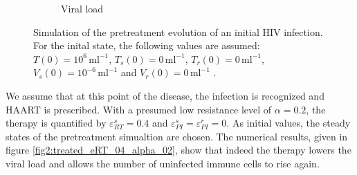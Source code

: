 \begin{figure}
\begin{subfigure}[b]{0.475\textwidth}
        \caption[]%
        {{\small Viral load}}    
        \label{fig1c:viral_load}
    \end{subfigure}
    \caption[]{Simulation of the pretreatment evolution of an initial HIV infection.
    For the inital state, the following values are assumed: $T(0) = 10^{6} \, \text{ml}^{-1}$, $T_s(0) = 0 \, \text{ml}^{-1}$, 
    $T_r(0) = 0 \, \text{ml}^{-1}$, $V_s(0) = 10^{-6} \, \text{ml}^{-1}$ and $V_r(0) = 0 \, \text{ml}^{-1}$ \cite{perelson1993dynamics}.}
    \label{fig:untreated}
\end{figure}

We assume that at this point of the disease, the infection is recognized and HAART is prescribed.
With a presumed low resistance level of $\alpha = 0.2$, the therapy is quantified by $\varepsilon_{RT}^{s} = 0.4$ and $\varepsilon_{PI}^{s} = \varepsilon_{PI}^{r} = 0$.
As initial values, the steady states of the pretreatment simualtion are chosen.\newline
The numerical results, given in figure \ref{fig2:treated_eRT_04_alpha_02}, show that indeed the therapy lowers the viral load and allows the 
number of uninfected immune cells to rise again.

